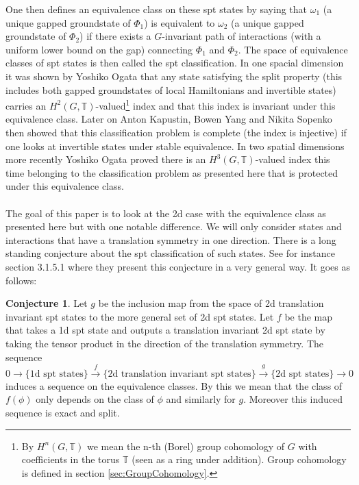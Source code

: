 \documentclass[12pt,a4paper,twoside]{article}
\newcommand{\TT}{\mathbb T}
\theoremstyle{definition}
\newtheorem{conjecture}[theorem]{Conjecture}
\numberwithin{equation}{section}
\begin{document}
One then defines an equivalence class on these spt states by saying that $\omega_1$ (a unique gapped groundstate of $\Phi_1$) is equivalent to $\omega_2$ (a unique gapped groundstate of $\Phi_2$) if there exists a $G$-invariant path of interactions (with a uniform lower bound on the gap) connecting $\Phi_1$ and $\Phi_2$. The space of equivalence classes of spt states is then called the spt classification. In one spacial dimension it was shown by Yoshiko Ogata \cite{ogata2019classification} that any state satisfying the split property (this includes both gapped groundstates of local Hamiltonians and invertible states) carries an $H^2(G,\TT)$-valued\footnote{By $H^n(G,\TT)$ we mean the n-th (Borel) group cohomology of $G$ with coefficients in the torus $\TT$ (seen as a ring under addition). Group cohomology is defined in section \ref{sec:GroupCohomology}.} index and that this index is invariant under this equivalence class. Later on Anton Kapustin, Bowen Yang and Nikita Sopenko \cite{kapustin2021classification} then showed that this classification problem is complete (the index is injective) if one looks at invertible states under stable equivalence. In two spatial dimensions more recently Yoshiko Ogata \cite{ogata2021h3gmathbb} proved there is an $H^3(G,\TT)$-valued index this time belonging to the classification problem as presented here that is protected under this equivalence class.
\\\\
The goal of this paper is to look at the 2d case with the equivalence class as presented here but with one notable difference. We will only consider states and interactions that have a translation symmetry in one direction. There is a long standing conjecture about the spt classification of such states. See for instance \cite{xiong2019classification} section 3.1.5.1 where they present this conjecture in a very general way. It goes as follows:
\begin{conjecture}\label{conj}
	Let $g$ be the inclusion map from the space of 2d translation invariant spt states to the more general set of 2d spt states. Let $f$ be the map that takes a 1d spt state and outputs a translation invariant 2d spt state by taking the tensor product in the direction of the translation symmetry. The sequence
	\begin{equation}
		0\rightarrow\{\text{1d spt states}\}\stackrel{f}{\rightarrow}\{\text{2d translation invariant spt states}\}\stackrel{g}{\rightarrow}\{\text{2d spt states}\}\rightarrow 0
	\end{equation}
	induces a sequence on the equivalence classes. By this we mean that the class of $f(\phi)$ only depends on the class of $\phi$ and similarly for $g$. Moreover this induced sequence is exact and split.
\end{conjecture}
\end{document}
